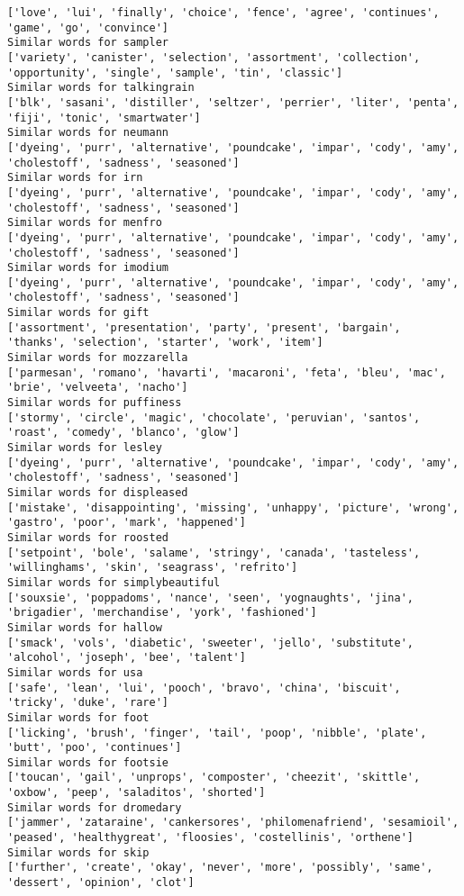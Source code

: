 \documentclass[11pt]{article}
\begin{document}
\begin{Verbatim}[commandchars=\\\{\}]
['love', 'lui', 'finally', 'choice', 'fence', 'agree', 'continues', 'game', 'go', 'convince']
Similar words for sampler
['variety', 'canister', 'selection', 'assortment', 'collection', 'opportunity', 'single', 'sample', 'tin', 'classic']
Similar words for talkingrain
['blk', 'sasani', 'distiller', 'seltzer', 'perrier', 'liter', 'penta', 'fiji', 'tonic', 'smartwater']
Similar words for neumann
['dyeing', 'purr', 'alternative', 'poundcake', 'impar', 'cody', 'amy', 'cholestoff', 'sadness', 'seasoned']
Similar words for irn
['dyeing', 'purr', 'alternative', 'poundcake', 'impar', 'cody', 'amy', 'cholestoff', 'sadness', 'seasoned']
Similar words for menfro
['dyeing', 'purr', 'alternative', 'poundcake', 'impar', 'cody', 'amy', 'cholestoff', 'sadness', 'seasoned']
Similar words for imodium
['dyeing', 'purr', 'alternative', 'poundcake', 'impar', 'cody', 'amy', 'cholestoff', 'sadness', 'seasoned']
Similar words for gift
['assortment', 'presentation', 'party', 'present', 'bargain', 'thanks', 'selection', 'starter', 'work', 'item']
Similar words for mozzarella
['parmesan', 'romano', 'havarti', 'macaroni', 'feta', 'bleu', 'mac', 'brie', 'velveeta', 'nacho']
Similar words for puffiness
['stormy', 'circle', 'magic', 'chocolate', 'peruvian', 'santos', 'roast', 'comedy', 'blanco', 'glow']
Similar words for lesley
['dyeing', 'purr', 'alternative', 'poundcake', 'impar', 'cody', 'amy', 'cholestoff', 'sadness', 'seasoned']
Similar words for displeased
['mistake', 'disappointing', 'missing', 'unhappy', 'picture', 'wrong', 'gastro', 'poor', 'mark', 'happened']
Similar words for roosted
['setpoint', 'bole', 'salame', 'stringy', 'canada', 'tasteless', 'willinghams', 'skin', 'seagrass', 'refrito']
Similar words for simplybeautiful
['souxsie', 'poppadoms', 'nance', 'seen', 'yognaughts', 'jina', 'brigadier', 'merchandise', 'york', 'fashioned']
Similar words for hallow
['smack', 'vols', 'diabetic', 'sweeter', 'jello', 'substitute', 'alcohol', 'joseph', 'bee', 'talent']
Similar words for usa
['safe', 'lean', 'lui', 'pooch', 'bravo', 'china', 'biscuit', 'tricky', 'duke', 'rare']
Similar words for foot
['licking', 'brush', 'finger', 'tail', 'poop', 'nibble', 'plate', 'butt', 'poo', 'continues']
Similar words for footsie
['toucan', 'gail', 'unprops', 'composter', 'cheezit', 'skittle', 'oxbow', 'peep', 'saladitos', 'shorted']
Similar words for dromedary
['jammer', 'zataraine', 'cankersores', 'philomenafriend', 'sesamioil', 'peased', 'healthygreat', 'floosies', 'costellinis', 'orthene']
Similar words for skip
['further', 'create', 'okay', 'never', 'more', 'possibly', 'same', 'dessert', 'opinion', 'clot']

\end{Verbatim}
\end{document}
